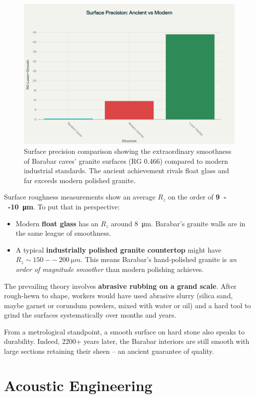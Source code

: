 \documentclass[11pt]{article}
\begin{document}
\begin{figure}[H]
\centering
\includegraphics[width=0.8\linewidth]{.github/surface_precision_comparison.png}
\caption{Surface precision comparison showing the extraordinary smoothness of Barabar caves' granite surfaces (RG 0.466) compared to modern industrial standards. The ancient achievement rivals float glass and far exceeds modern polished granite.}
\label{fig:surface_precision}
\end{figure}

Surface roughness measurements show an average $R_z$ on the order of \textbf{\SI{9}{--}\SI{10}{\micro m}}. To put that in perspective:

\begin{itemize}
\item Modern \textbf{float glass} has an $R_z$ around \SI{8}{\micro m}. Barabar's granite walls are in the same league of smoothness.
\item A typical \textbf{industrially polished granite countertop} might have $R_z \sim \SI{150}{--}\SI{200}{\micro m}$. This means Barabar's hand-polished granite is \textit{an order of magnitude smoother} than modern polishing achieves.
\end{itemize}

The prevailing theory involves \textbf{abrasive rubbing on a grand scale}. After rough-hewn to shape, workers would have used abrasive slurry (silica sand, maybe garnet or corundum powders, mixed with water or oil) and a hard tool to grind the surfaces systematically over months and years.

From a metrological standpoint, a smooth surface on hard stone also speaks to durability. Indeed, 2200+ years later, the Barabar interiors are still smooth with large sections retaining their sheen -- an ancient guarantee of quality.

\section{Acoustic Engineering}
\end{document}
